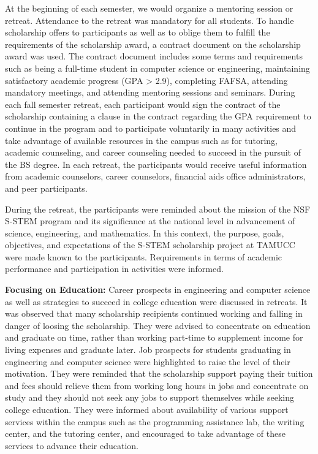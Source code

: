 \documentclass{article}
\begin{document}
At the beginning of each semester, we would organize a mentoring session or retreat. Attendance to the retreat was mandatory for all students. To handle scholarship offers to participants as well as to oblige them to fulfill the requirements of the scholarship award, a contract document on the scholarship award was used. The contract document includes some terms and requirements such as being a full-time student in computer science or engineering, maintaining satisfactory academic progress (GPA > 2.9), completing FAFSA, attending mandatory meetings, and attending mentoring sessions and seminars. During each fall semester retreat, each participant would sign the contract of the scholarship containing a clause in the contract regarding the GPA requirement to continue in the program and to participate voluntarily in many activities and take advantage of available resources in the campus such as for tutoring, academic counseling, and career counseling needed to succeed in the pursuit of the BS degree.  In each retreat, the participants would receive useful information from academic counselors, career counselors, financial aids office administrators, and peer participants.  

During the retreat, the participants were reminded about the mission of the NSF S-STEM program and its significance at the national level in advancement of science, engineering, and mathematics. In this context, the purpose, goals, objectives, and expectations of the S-STEM scholarship project at TAMUCC were made known to the participants. Requirements in terms of academic performance and participation in activities were informed.

\textbf{Focusing on Education:} Career prospects in engineering and computer science as well as strategies to succeed in college education were discussed in retreats. It was observed that many scholarship recipients continued working and falling in danger of loosing the scholarship. They were advised to concentrate on education and graduate on time, rather than working part-time to supplement income for living expenses and graduate later. Job prospects for students graduating in engineering and computer science were highlighted to raise the level of their motivation. They were reminded that the scholarship support paying their tuition and fees should relieve them from working long hours in jobs and concentrate on study and they should not seek any jobs to support themselves while seeking college education. They were informed about availability of various support services within the campus such as the programming assistance lab, the writing center, and the tutoring center, and encouraged to take advantage of these services to advance their education. 
\end{document}
